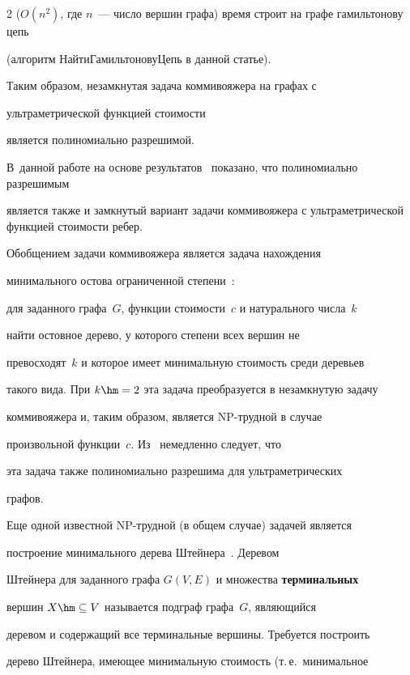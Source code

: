 \begin{multicols}{2}
($O(n^2)$, где $n$~--- число вершин графа) время строит на графе гамильтонову цепь


(алгоритм {\sf НайтиГамильтоновуЦепь} в данной \mbox{статье}).


Таким образом, незамкнутая задача коммивояжера на графах с


ультраметрической функцией сто\-и\-мости


является полиномиально разрешимой.


В~данной работе на основе результатов~\cite{Gusfield} показано, что полиномиально разрешимым


является также и за\-мк\-ну\-тый вариант задачи коммивояжера с ульт\-ра\-мет\-ри\-че\-ской функцией стоимости ребер.





Обобщением задачи коммивояжера является задача нахождения


минимального остова ограниченной степени~\cite{Gary_Johnson, Bui}:


для заданного графа~$G$, функции стоимости~$c$ и натурального числа~$k$


найти остовное дерево, у которого степени всех вершин не


превосходят~$k$ и которое имеет минимальную стоимость среди деревьев


такого вида. При $k\hm=2$ эта задача преобразуется в незамкнутую задачу


коммивояжера и, таким образом, является NP-труд\-ной в случае


произвольной функции~$c$. Из~\cite{Gusfield} немедленно следует, что


эта задача также полиномиально разрешима для ультраметрических


графов.





Еще одной известной NP-труд\-ной (в общем случае) задачей является


построение минимального дерева Штейнера~\cite{Gary_Johnson}. Деревом


Штейнера для заданного графа $G(V,E)$ и множества \textbf{терминальных}


вершин $X \hm\subseteq V$ называется подграф графа~$G$, являющийся


деревом и содержащий все терминальные вершины. Требуется построить


дерево Штейнера, имеющее минимальную стоимость (т.\,е.\ минимальное



\end{multicols}
